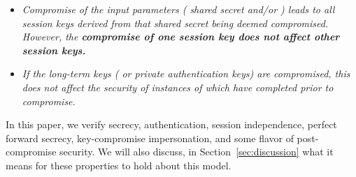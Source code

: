 \begin{itemize}
{        KCI. I propose we delete it.}
    \item \textit{Compromise of the \mHkdf{} input parameters (\mGxy{} shared
            secret and/or \mPsk) leads to all session keys derived from that
            shared secret being deemed compromised. However, the
            \textbf{compromise of one session key does not affect other
            session keys.}
    }
\item \textit{
        If the long-term keys (\mPsk{} or private authentication keys) are
        compromised, this does not affect the security of instances of
        \mEdhoc{} which have completed prior to compromise.
        }
\end{itemize}

In this paper, we verify secrecy, authentication, session independence,
perfect forward secrecy, key-compromise impersonation, and some
flavor of post-compromise security.
We will also discuss, in Section~\ref{sec:discussion} what it means for
these properties to hold about this model.
